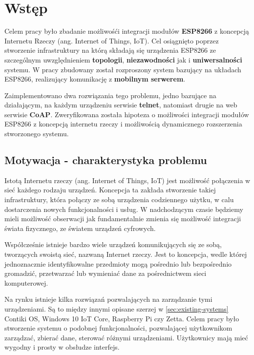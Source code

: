 
 

\section{Wstęp}
\label{sec:wstep}
Celem pracy było zbadanie możliwośći integracji modułów \textbf{ESP8266} z koncepcją  Internetu Rzeczy (ang. Internet of Things, IoT). Cel osiągnięto poprzez stworzenie infrastruktury na którą składają się urządzenia ESP8266 ze szczególnym uwzględnieniem \textbf{topologii}, \textbf{niezawodności} jak i \textbf{uniwersalności} systemu. W pracy zbudowany został rozproszony system bazujący na układach ESP8266, realizujący komunikację z \textbf{mobilnym serwerem}.

Zaimplementowano dwa rozwiązania tego problemu, jedno bazujące na działającym, na każdym urządzeniu serwisie \textbf{telnet}, natomiast drugie na web serwisie \textbf{CoAP}. Zweryfikowana została hipoteza o możliwości integracji modułów ESP8266 z koncepcją internetu rzeczy i możliwością dynamicznego rozszerzenia stworzonego systemu.

\subsection{Motywacja - charakterystyka problemu}
Istotą Internetu rzeczy (ang. Internet of Things, IoT) jest możliwość połączenia w sieć każdego rodzaju urządzeń. Koncepcja ta zakłada stworzenie takiej infrastruktury, która połączy ze sobą urządzenia codziennego użytku, w calu dostarczenia nowych funkcjonalności i usług. W nadchodzącym czasie będziemy mieli możliwość obserwacji jak fundamentalnie zmienia się możliwość integracji świata fizycznego, ze światem urządzeń cyfrowych. 

Współcześnie istnieje bardzo wiele urządzeń komunikujących się ze sobą, tworzących swoistą sieć, nazwaną Internet rzeczy\cite{iot-art}. Jest to koncepcja, wedle której jednoznacznie identyfikowalne przedmioty mogą pośrednio lub bezpośrednio gromadzić, przetwarzać lub wymieniać dane za pośrednictwem sieci komputerowej. 

Na rynku istnieje kilka rozwiązań pozwalających na zarządzanie tymi urządzeniami. Są to między innymi opisane szerzej w \autoref{sec:existing-systems} Contiki OS, Windows 10 IoT Core, Raspberry Pi czy Zetta. Celem pracy było stworzenie systemu o podobnej funkcjonalności, pozwalającej użytkownikom zarządzać, zbierać dane, sterować różnymi urządzeniami. Użytkownicy mają mieć wygodny i prosty w obsłudze interfejs. 

